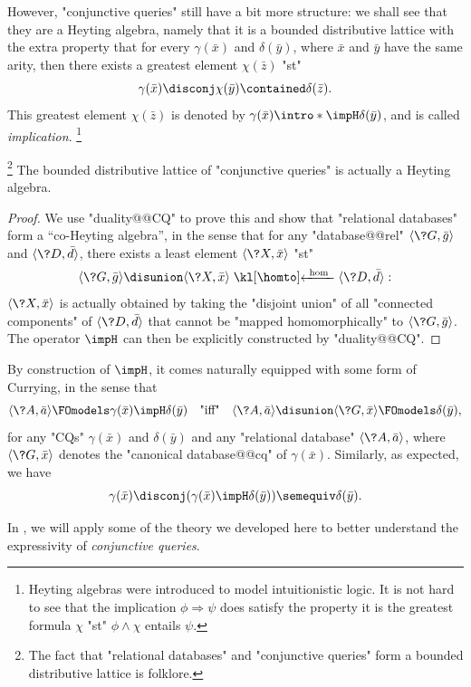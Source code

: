 However, "conjunctive queries" still have a bit more structure: we shall
see that they are a Heyting algebra, namely that it is a bounded distributive lattice
with the extra property that for every $\gamma(\bar x)$ and $\delta(\bar y)$,
where $\bar x$ and $\bar y$ have the same arity, then there exists
a greatest element $\chi(\bar z)$ "st"
\[
	\gamma(\bar x) \disconj \chi(\bar y) \contained \delta(\Bar z). 
\]
This greatest element $\chi(\bar z)$ is denoted by \AP$\gamma(\bar x) \intro*\impH \delta(\bar y)$, and is called \emph{implication}.%
\footnote{Heyting algebras were introduced to model intuitionistic logic.
It is not hard to see that the implication $\phi \Rightarrow \psi$
does satisfy the property it is the greatest formula $\chi$
"st" $\phi \land \chi$ entails $\psi$.}

\begin{proposition}
	\!\footnote{The fact that "relational databases" and "conjunctive queries" form
	a bounded distributive lattice is folklore.}
	The bounded distributive lattice of "conjunctive queries" is actually
	a Heyting algebra.
\end{proposition}

\begin{proof}
	We use "duality@@CQ" to prove this and show that "relational databases" form a ``co-Heyting algebra'',
	in the sense that for any "database@@rel" $\tup{\?G, \bar g}$ and $\tup{\?D, \bar d}$,
	there exists a least element $\tup{\?X, \bar x}$ "st"
	\[
		\tup{\?G, \bar g} \disunion \tup{\?X, \bar x} \cohomto \tup{\?D, \bar d}:
	\]
	$\tup{\?X, \bar x}$ is actually obtained by taking the "disjoint union"
	of all "connected components" of $\tup{\?D, \bar d}$ 
	that cannot be "mapped homomorphically" to $\tup{\?G, \bar g}$.
	The operator $\impH$ can then be explicitly constructed by "duality@@CQ".
\end{proof}

By construction of $\impH$, it comes naturally equipped with some
form of Currying, in the sense that
\[
	\tup{\?A, \bar a}
	\FOmodels \gamma(\bar x) \impH \delta(\bar y)
	\quad\text{"iff"}\quad
	\tup{\?A, \bar a} \disunion \tup{\?G, \bar x}
	\FOmodels \delta(\bar y),
\]
for any "CQs" $\gamma(\bar x)$ and $\delta(\bar y)$
and any "relational database" $\tup{\?A, \bar a}$,
where $\tup{\?G, \bar x}$ denotes the "canonical database@@cq" of $\gamma(\bar x)$.
Similarly, as expected, we have
\[
	\gamma(\bar x) \disconj (\gamma(\bar x) \impH \delta(\bar y))
	\semequiv
	\delta(\bar y).
\]

In ,
we will apply some of the theory we developed here
to better understand the expressivity of \emph{conjunctive queries}.

